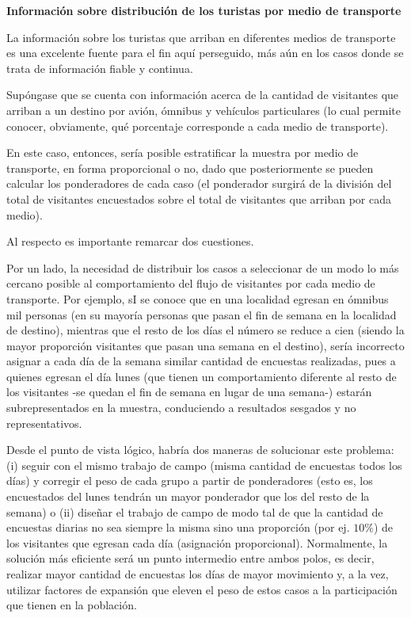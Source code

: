 \documentclass[
]{book}
\begin{document}
\textbf{Información sobre distribución de los turistas por medio de transporte}

La información sobre los turistas que arriban en diferentes medios de transporte es una excelente fuente para el fin aquí perseguido, más aún en los casos donde se trata de información fiable y continua.

Supóngase que se cuenta con información acerca de la cantidad de visitantes que arriban a un destino por avión, ómnibus y vehículos particulares (lo cual permite conocer, obviamente, qué porcentaje corresponde a cada medio de transporte).

En este caso, entonces, sería posible estratificar la muestra por medio de transporte, en forma proporcional o no, dado que posteriormente se pueden calcular los ponderadores de cada caso (el ponderador surgirá de la división del total de visitantes encuestados sobre el total de visitantes que arriban por cada medio).

Al respecto es importante remarcar dos cuestiones.

Por un lado, la necesidad de distribuir los casos a seleccionar de un modo lo más cercano posible al comportamiento del flujo de visitantes por cada medio de transporte. Por ejemplo, sI se conoce que en una localidad egresan en ómnibus mil personas (en su mayoría personas que pasan el fin de semana en la localidad de destino), mientras que el resto de los días el número se reduce a cien (siendo la mayor proporción visitantes que pasan una semana en el destino), sería incorrecto asignar a cada día de la semana similar cantidad de encuestas realizadas, pues a quienes egresan el día lunes (que tienen un comportamiento diferente al resto de los visitantes -se quedan el fin de semana en lugar de una semana-) estarán subrepresentados en la muestra, conduciendo a resultados sesgados y no representativos.

Desde el punto de vista lógico, habría dos maneras de solucionar este problema: (i) seguir con el mismo trabajo de campo (misma cantidad de encuestas todos los días) y corregir el peso de cada grupo a partir de ponderadores (esto es, los encuestados del lunes tendrán un mayor ponderador que los del resto de la semana) o (ii) diseñar el trabajo de campo de modo tal de que la cantidad de encuestas diarias no sea siempre la misma sino una proporción (por ej. \(10\%\)) de los visitantes que egresan cada día (asignación proporcional). Normalmente, la solución más eficiente será un punto intermedio entre ambos polos, es decir, realizar mayor cantidad de encuestas los días de mayor movimiento y, a la vez, utilizar factores de expansión que eleven el peso de estos casos a la participación que tienen en la población.
\end{document}
